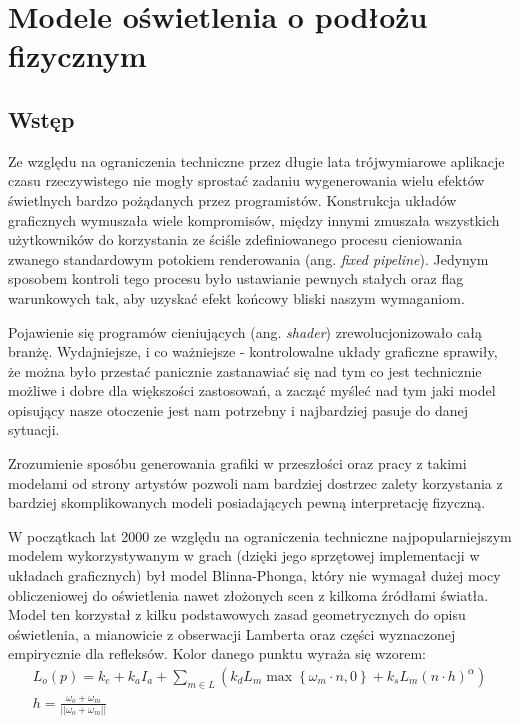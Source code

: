 \documentclass[../main.tex]{subfiles}
\begin{document}
\chapter{Modele oświetlenia o podłożu fizycznym}

\section{Wstęp}

Ze względu na ograniczenia techniczne przez długie lata trójwymiarowe aplikacje czasu rzeczywistego nie mogły sprostać zadaniu wygenerowania wielu efektów świetlnych bardzo pożądanych przez programistów. Konstrukcja układów graficznych wymuszała wiele kompromisów, między innymi zmuszała wszystkich użytkowników do korzystania ze ściśle zdefiniowanego procesu cieniowania zwanego standardowym potokiem renderowania (ang. \textit{fixed pipeline}). Jedynym sposobem kontroli tego procesu było ustawianie pewnych stałych oraz flag warunkowych tak, aby uzyskać efekt końcowy bliski naszym wymaganiom.

Pojawienie się programów cieniujących (ang. \textit{shader}) zrewolucjonizowało całą branżę. Wydajniejsze, i co ważniejsze - kontrolowalne układy graficzne sprawiły, że można było przestać panicznie zastanawiać się nad tym co jest technicznie możliwe i dobre dla większości zastosowań, a zacząć myśleć nad tym jaki model opisujący nasze otoczenie jest nam potrzebny i najbardziej pasuje do danej sytuacji.

Zrozumienie sposóbu generowania grafiki w przeszłości oraz pracy z takimi modelami od strony artystów pozwoli nam bardziej dostrzec zalety korzystania z bardziej skomplikowanych modeli posiadających pewną interpretację fizyczną.

W początkach lat 2000 ze względu na ograniczenia techniczne najpopularniejszym modelem wykorzystywanym w grach (dzięki jego sprzętowej implementacji w układach graficznych) był model Blinna-Phonga, który nie wymagał dużej mocy obliczeniowej do oświetlenia nawet złożonych scen z kilkoma źródłami światła. Model ten korzystał z kilku podstawowych zasad geometrycznych do opisu oświetlenia, a mianowicie z obserwacji Lamberta oraz części wyznaczonej empirycznie dla refleksów. Kolor danego punktu wyraża się wzorem:
\begin{gather*}
  L_o(p) = 
  	k_e + 
  	k_a I_a +
    \sum_{m \in L} \left( {
      k_d L_m \max\left\{{ \omega_m \cdot n, 0 }\right\} +
      k_s L_m (n \cdot h)^{\alpha}
    } \right) \\
    h = \frac{\omega_o+\omega_m}{||\omega_o+\omega_m||}
\end{gather*}
\end{document}
